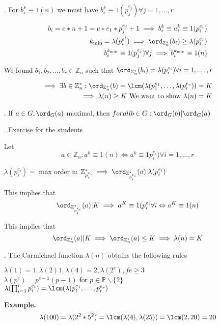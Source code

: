 \Proof.
For $b_i^k \equiv 1 (n)$ we must have $b_i^k \equiv 1 (p_j^{e_j}) \forall j = 1, \ldots, r$

\begin{align*}
  b_i = c*n+1 = c*c_1* p_j^{e_j} +1 \implies b_i^k \equiv a_i^k \equiv 1 (p_i ^{e_i}) \\
  k_{\min} = \lambda(p_i^{e^i}) \implies \ord_{\mathbb{Z}_n^{*}}(b_i) \geq \lambda(p_i^{e_i}) \\
  b_i^{k_{\min}} \equiv 1 (p_j^{e_j}) \forall j \implies b_i^{k_{\min}} \equiv 1 (n)
\end{align*}

We found $b_1, b_2, \ldots, b_r \in \mathbb{Z}_n$ such that $\ord_{\mathbb{Z}_n^{*}}(b_i) = \lambda(p_i^{e_i}) \forall i = 1, \ldots, r$

\begin{align*}
  \implies \exists b \in \mathbb{Z}_n^{*}: \ord_{\mathbb{Z}_n^{*}}(b) = \lcm(\lambda(p_1^{e_1}, \ldots, \lambda(p_r^{e_r})) = K \\
  \implies \lambda(n) \geq K \text{ We want to show $\lambda(n) = K$}
\end{align*}

\Theorem.
If $ a\in G, \ord_G(a)$ maximal, then $forall b \in G: \ord_G(b) | \ord_G(a)$

\Proof. 
Exercise for the students

Let 
\[
  a\in \mathbb{Z}_n: a^k \equiv 1 (n) \Leftrightarrow a^k \equiv 1 p_i^{e_i}) \forall i = 1,\ldots, r
\]

$\lambda(p_i^{e_i}) = $ max order in $\mathbb{Z}_{p_i^{e_i}}^{*} \implies \ord_{\mathbb{Z}_{p_i^{e_i}}^{*}}(a) | \lambda(p_i^{e_i})$

This implies that
\[
  \ord_{\mathbb{Z}_{p_i^{e_i}}^{*}}(a) | K \implies a^K \equiv 1 (p_i^{e_i} \forall i \Leftrightarrow a^K \equiv 1 (n)
\]

This implies that
\[
\ord_{\mathbb{Z}_{n}^{*}}(a) | K \implies  \ord_{\mathbb{Z}_n^{*}}(a) \leq K \implies \lambda(n) = K
\]

\Theorem.
The Carmichael function $\lambda(n)$ obtains the following rules

$\lambda(1) = 1, \lambda(2) 1, \lambda(4) = 2, \lambda(2^e), f e \geq 3$\\
$\lambda(p^e) = p^{e-1}(p-1)$ for $p\in \mathbb{P} \backslash\{2\}$\\
$\lambda(\prod_{i=1}^{r} p_i^{e_i}) = \lcm(\lambda(p_1^{e_1}, \ldots, p_r^{e_r})$

\textbf{Example.}
\[
  \lambda(100) = \lambda(2^2 * 5^2) = \lcm(\lambda(4), \lambda(25)) = \lcm(2,20) = 20
\]

